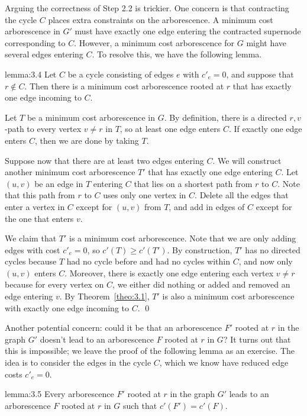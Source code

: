 Arguing the correctness of Step 2.2 is trickier. One concern is that 
contracting the cycle $C$ places extra constraints on the 
arborescence. A minimum cost arborescence in $G'$ must have exactly 
one edge entering the contracted supernode corresponding to $C$. 
However, a minimum cost arborescence for $G$ might have several edges 
entering $C$. To resolve this, we have the following lemma. 

\begin{lemma}{lemma:3.4}
    Let $C$ be a cycle consisting of edges $e$ with $c'_e = 0$, and 
    suppose that $r \notin C$. Then there is a minimum cost arborescence 
    rooted at $r$ that has exactly one edge incoming to $C$.
\end{lemma}\vspace{-0.15cm}
\begin{pf}
    Let $T$ be a minimum cost arborescence in $G$. By definition, there is a 
    directed $r,v$-path to every vertex $v \neq r$ in $T$, so at least one 
    edge enters $C$. If exactly one edge enters $C$, then we are done by taking $T$. 

    Suppose now that there are at least two edges entering $C$. We will 
    construct another minimum cost arborescence $T'$ that has exactly 
    one edge entering $C$. Let $(u, v)$ be an edge in $T$ entering $C$ 
    that lies on a shortest path from $r$ to $C$. Note that this path from 
    $r$ to $C$ uses only one vertex in $C$. Delete all the edges that 
    enter a vertex in $C$ except for $(u, v)$ from $T$, and add in 
    edges of $C$ except for the one that enters $v$. 

    We claim that $T'$ is a minimum cost arborescence. Note that we are 
    only adding edges with cost $c'_e = 0$, so $c'(T) \geq c'(T')$. 
    By construction, $T'$ has no directed cycles because $T$ had no cycle 
    before and had no cycles within $C$, and now only $(u, v)$ enters $C$. 
    Moreover, there is exactly one edge entering each vertex $v \neq r$ 
    because for every vertex on $C$, we either did nothing or added 
    and removed an edge entering $v$. By Theorem~\ref{theo:3.1}, $T'$ is 
    also a minimum cost arborescence with exactly one edge incoming to $C$. \qed
\end{pf}\vspace{-0.25cm}

Another potential concern: could it be that an arborescence $F'$ rooted at $r$ in the graph 
$G'$ doesn't lead to an arborescence $F$ rooted at $r$ in $G$? It turns 
out that this is impossible; we leave the proof of the following lemma 
as an exercise. The idea is to consider the edges in the cycle $C$, which 
we know have reduced edge costs $c'_e = 0$. 

\begin{lemma}{lemma:3.5}
    Every arborescence $F'$ rooted at $r$ in the graph $G'$ leads to 
    an arborescence $F$ rooted at $r$ in $G$ such that $c'(F') = c'(F)$. 
\end{lemma}\vspace{-0.15cm}
